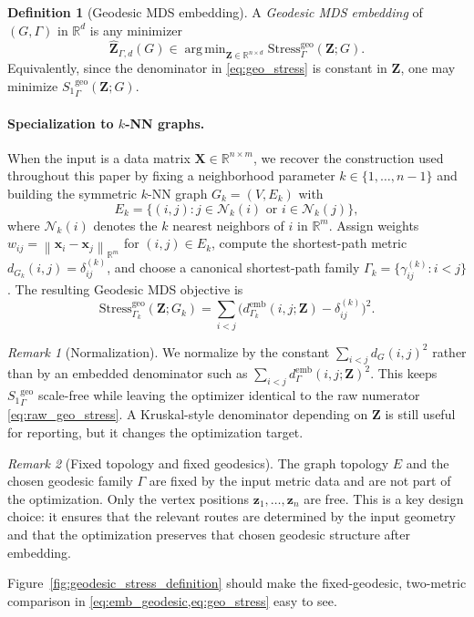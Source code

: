 \documentclass[11pt]{article}
\newcommand{\R}{\mathbb{R}}
\newcommand{\bx}{\mathbf{x}}
\newcommand{\bX}{\mathbf{X}}
\newcommand{\bz}{\mathbf{z}}
\newcommand{\bZ}{\mathbf{Z}}
\newcommand{\norm}[1]{\left\|#1\right\|}
\newcommand{\demb}{d^{\mathrm{emb}}}
\newcommand{\Gk}{G_k}
\newcommand{\Stress}{\mathrm{Stress}}
\newcommand{\StressOne}{S_1}
\DeclareMathOperator*{\argmin}{arg\,min}
\theoremstyle{definition}
\newtheorem{definition}{Definition}[section]
\theoremstyle{plain}
\theoremstyle{remark}
\newtheorem{remark}{Remark}[section]
\begin{document}
\begin{definition}[Geodesic MDS embedding]
  \label{def:gmds_embedding}
  A \emph{Geodesic MDS embedding} of $(G,\Gamma)$ in $\R^d$ is any
  minimizer
  \begin{equation}
    \hat{\bZ}_{\Gamma,d}(G)
    \in \argmin_{\bZ \in \R^{n \times d}}
    \Stress^{\mathrm{geo}}_{\Gamma}(\bZ; G).
    \label{eq:geo_mds}
  \end{equation}
  Equivalently, since the denominator in \cref{eq:geo_stress} is constant
  in $\bZ$, one may minimize ${\StressOne}_{\Gamma}^{\mathrm{geo}}(\bZ; G)$.
\end{definition}

\paragraph{Specialization to $k$-NN graphs.}
When the input is a data matrix $\bX \in \R^{n \times m}$, we recover the
construction used throughout this paper by fixing a neighborhood parameter
$k \in \{1,\ldots,n-1\}$ and building the symmetric $k$-NN graph
$\Gk = (V, E_k)$ with
\begin{equation}
  E_k = \{(i,j) : j \in \mathcal{N}_k(i) \text{ or } i \in \mathcal{N}_k(j)\},
  \label{eq:knn_edges}
\end{equation}
where $\mathcal{N}_k(i)$ denotes the $k$ nearest neighbors of $i$ in
$\R^m$.  Assign weights $w_{ij} = \norm{\bx_i - \bx_j}_{\R^m}$ for
$(i,j) \in E_k$, compute the shortest-path metric
$d_{\Gk}(i,j) = \delta_{ij}^{(k)}$, and choose a canonical shortest-path
family $\Gamma_k = \{\gamma_{ij}^{(k)} : i < j\}$.  The resulting Geodesic
MDS objective is
\begin{equation}
  \Stress^{\mathrm{geo}}_{\Gamma_k}(\bZ; \Gk)
  = \sum_{i < j}
    \bigl(\demb_{\Gamma_k}(i,j;\bZ) - \delta^{(k)}_{ij}\bigr)^2.
  \label{eq:knn_raw_geo_stress}
\end{equation}

\begin{remark}[Normalization]
  We normalize by the constant $\sum_{i<j} d_G(i,j)^2$ rather than by an
  embedded denominator such as $\sum_{i<j} \demb_{\Gamma}(i,j;\bZ)^2$.
  This keeps ${\StressOne}_{\Gamma}^{\mathrm{geo}}$ scale-free while
  leaving the optimizer identical to the raw numerator
  \cref{eq:raw_geo_stress}.  A Kruskal-style denominator depending on
  $\bZ$ is still useful for reporting, but it changes the optimization
  target.
\end{remark}

\begin{remark}[Fixed topology and fixed geodesics]
  The graph topology $E$ and the chosen geodesic family $\Gamma$ are fixed
  by the input metric data and are not part of the optimization.  Only the
  vertex positions $\bz_1,\ldots,\bz_n$ are free.  This is a key design
  choice: it ensures that the relevant routes are determined by the input
  geometry and that the optimization preserves that chosen geodesic
  structure after embedding.
\end{remark}
Figure~\ref{fig:geodesic_stress_definition} should make the fixed-geodesic,
two-metric comparison in \cref{eq:emb_geodesic,eq:geo_stress} easy to see.
\end{document}
